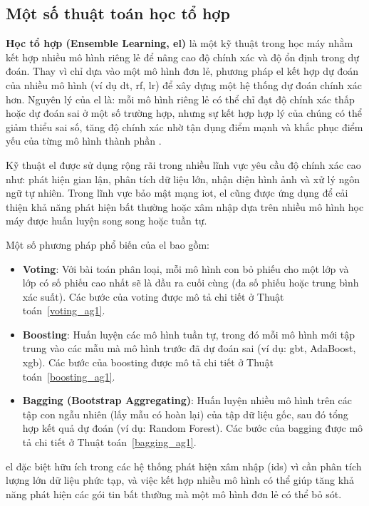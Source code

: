 \subsection{Một số thuật toán học tổ hợp}
\textbf{Học tổ hợp (Ensemble Learning, \ac{el})} là một kỹ thuật trong học máy nhằm kết hợp nhiều mô hình riêng lẻ để nâng cao độ chính xác và độ ổn định trong dự đoán. Thay vì chỉ dựa vào một mô hình đơn lẻ, phương pháp \ac{el} kết hợp dự đoán của nhiều mô hình (ví dụ \ac{dt}, \ac{rf}, \ac{lr}) để xây dựng một hệ thống dự đoán chính xác hơn. Nguyên lý của \ac{el} là: mỗi mô hình riêng lẻ có thể chỉ đạt độ chính xác thấp hoặc dự đoán sai ở một số trường hợp, nhưng sự kết hợp hợp lý của chúng có thể giảm thiểu sai số, tăng độ chính xác nhờ tận dụng điểm mạnh và khắc phục điểm yếu của từng mô hình thành phần \cite{zhou2012ensemble}.

Kỹ thuật \ac{el} được sử dụng rộng rãi trong nhiều lĩnh vực yêu cầu độ chính xác cao như: phát hiện gian lận, phân tích dữ liệu lớn, nhận diện hình ảnh và xử lý ngôn ngữ tự nhiên. Trong lĩnh vực bảo mật mạng \ac{iot}, \ac{el} cũng được ứng dụng để cải thiện khả năng phát hiện bất thường hoặc xâm nhập dựa trên nhiều mô hình học máy được huấn luyện song song hoặc tuần tự.

Một số phương pháp phổ biến của \ac{el} bao gồm:
\begin{itemize}
    \item \textbf{Voting}: Với bài toán phân loại, mỗi mô hình con bỏ phiếu cho một lớp và lớp có số phiếu cao nhất sẽ là đầu ra cuối cùng (đa số phiếu hoặc trung bình xác suất). Các bước của voting được mô tả chi tiết ở Thuật toán~\ref{voting_ag1}.
    \item \textbf{Boosting}: Huấn luyện các mô hình tuần tự, trong đó mỗi mô hình mới tập trung vào các mẫu mà mô hình trước đã dự đoán sai (ví dụ: \ac{gbt}, AdaBoost, \ac{xgb}). Các bước của boosting được mô tả chi tiết ở Thuật toán~\ref{boosting_ag1}.
    \item \textbf{Bagging (Bootstrap Aggregating)}: Huấn luyện nhiều mô hình trên các tập con ngẫu nhiên (lấy mẫu có hoàn lại) của tập dữ liệu gốc, sau đó tổng hợp kết quả dự đoán (ví dụ: Random Forest). Các bước của bagging được mô tả chi tiết ở Thuật toán~\ref{bagging_ag1}.
\end{itemize}

\ac{el} đặc biệt hữu ích trong các hệ thống phát hiện xâm nhập (\ac{ids}) vì cần phân tích lượng lớn dữ liệu phức tạp, và việc kết hợp nhiều mô hình có thể giúp tăng khả năng phát hiện các gói tin bất thường mà một mô hình đơn lẻ có thể bỏ sót.

